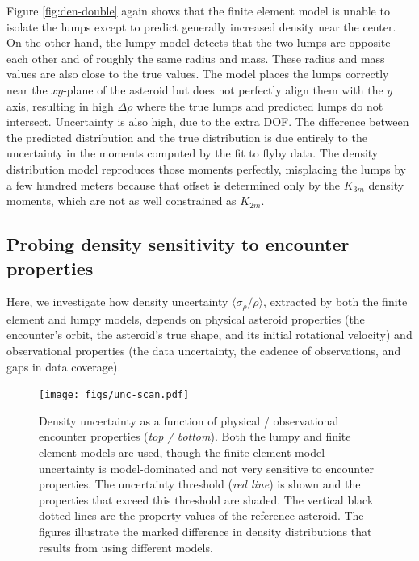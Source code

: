 \documentclass[fleqn,usenatbib]{mnras}
\begin{document}
Figure \ref{fig:den-double} again shows that the finite element model is unable to isolate the lumps except to predict generally increased density near the center. On the other hand, the lumpy model detects that the two lumps are opposite each other and of roughly the same radius and mass. These radius and mass values are also close to the true values. The model places the lumps correctly near the $xy$-plane of the asteroid but does not perfectly align them with the $y$ axis, resulting in high $\Delta \rho$ where the true lumps and predicted lumps do not intersect. Uncertainty is also high, due to the extra DOF. The difference between the predicted distribution and the true distribution is due entirely to the uncertainty in the moments computed by the fit to flyby data. The density distribution model reproduces those moments perfectly, misplacing the lumps by a few hundred meters because that offset is determined only by the $K_{3m}$ density moments, which are not as well constrained as $K_{2m}$.



\subsection{Probing density sensitivity to encounter properties}
\label{sec:density-uncertainty}

Here, we investigate how density uncertainty $\langle \sigma_\rho / \rho \rangle$, extracted by both the finite element and lumpy models, depends on physical asteroid properties (the encounter's orbit, the asteroid's true shape, and its initial rotational velocity) and observational properties (the data uncertainty, the cadence of observations, and gaps in data coverage).

\begin{figure}
  \centering
  \texttt{[image: figs/unc-scan.pdf]}
  \caption{Density uncertainty as a function of physical / observational encounter properties (\textit{top / bottom}). Both the lumpy and finite element models are used, though the finite element model uncertainty is model-dominated and not very sensitive to encounter properties. The uncertainty threshold (\textit{red line}) is shown and the properties that exceed this threshold are shaded. The vertical black dotted lines are the property values of the reference asteroid. The figures illustrate the marked difference in density distributions that results from using different models.}
  \label{fig:net-uncertainty}
\end{figure}
\end{document}
